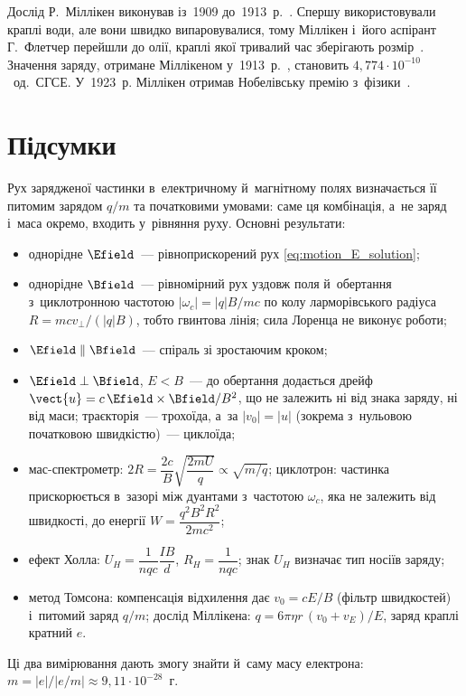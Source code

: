 \begin{Historical}
Дослід Р.~Міллікен виконував із~1909 до~1913~р.~\cite{APSNews2006Millikan}. Спершу використовували краплі води, але вони швидко випаровувалися, тому Міллікен і~його аспірант Г.~Флетчер перейшли до олії, краплі якої тривалий час зберігають розмір~\cite{APSNews2006Millikan}. Значення заряду, отримане Міллікеном у~1913~р.~\cite{Millikan1913}, становить $4{,}774\cdot10^{-10}$~од.~СГСЕ. У~1923~р. Міллікен отримав Нобелівську премію з~фізики~\cite{Nobel1923}.
\end{Historical}


\section*{Підсумки}


{}

Рух зарядженої частинки в~електричному й~магнітному полях визначається її питомим зарядом $q/m$ та початковими умовами: саме ця комбінація, а~не заряд і~маса окремо, входить у~рівняння руху. Основні результати:
\begin{itemize}
	\item однорідне $\Efield$~--- рівноприскорений рух \eqref{eq:motion_E_solution};
	\item однорідне $\Bfield$~--- рівномірний рух уздовж поля й~обертання з~циклотронною частотою $|\omega_c| = |q|B/mc$ по колу ларморівського радіуса $R = mcv_{\perp}/(|q|B)$, тобто гвинтова лінія; сила Лоренца не виконує роботи;
	\item $\Efield \parallel \Bfield$~--- спіраль зі зростаючим кроком;
	\item $\Efield \perp \Bfield$, $E < B$~--- до обертання додається дрейф $\vect{u} = c\,\Efield \times \Bfield/B^2$, що не залежить ні від знака заряду, ні від маси; траєкторія~--- трохоїда, а~за $|v_0| = |u|$ (зокрема з~нульовою початковою швидкістю)~--- циклоїда;
	\item мас-спектрометр: $2R = \dfrac{2c}{B}\sqrt{\dfrac{2mU}{q}} \propto \sqrt{m/q}$; циклотрон: частинка прискорюється в~зазорі між дуантами з~частотою $\omega_c$, яка не залежить від швидкості, до енергії $W = \dfrac{q^2B^2R^2}{2mc^2}$;
	\item ефект Холла: $U_H = \dfrac{1}{nqc}\dfrac{IB}{d}$, $R_H = \dfrac{1}{nqc}$; знак $U_H$ визначає тип носіїв заряду;
	\item метод Томсона: компенсація відхилення дає $v_0 = cE/B$ (фільтр швидкостей) і~питомий заряд $q/m$; дослід Міллікена: $q = 6\pi\eta r\,(v_0 + v_E)/E$, заряд краплі кратний $e$.
\end{itemize}
Ці два вимірювання дають змогу знайти й~саму масу електрона: $m = |e|/|e/m| \approx 9{,}11\cdot10^{-28}$~г.


